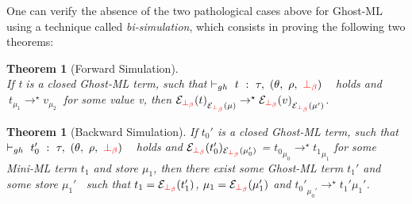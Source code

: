 \documentclass[a4paper,11pt,oneside]{article}
\theoremstyle{plain}
\newtheorem{theorem}[definition]{Theorem}
\newcommand{\rouge}[1]{\textcolor{red}{#1}}
\newcommand{\ghosttyping}[6]{\vdash_{gh}~#1~:~#2,~(#3,~#4,~\rouge{#5})~\textcolor{blue}{\boldsymbol{#6}}}
\newcommand{\evalstar}[4]{~#1_{\mu_#2} \rightarrow^{\star} #3_{\mu_#4} ~}
\newcommand{\Longdownarrow}{\rotatebox{90}{$\Longleftarrow$}}
\newcommand{\gbb}{\bot_\beta}
\newcommand{\gbbr}{\textcolor{red}{\gbb}}
\newcommand{\e}{\mathcal{E}}
\newcommand{\ebot}[1]{\e_{\gbbr}(#1)}
\begin{document}


One can verify the absence of the two pathological cases above for Ghost-ML
using a technique called \textit{bi-simulation}, which consists in proving  
the following two theorems:

\begin{theorem}[Forward Simulation]
~\\
If t is a closed Ghost-ML term, such that $\ghosttyping{t}{\tau}{\theta}{\rho}{\gbbr}{}$ ~holds and $\evalstar{t}{1}{v}{2}$ 
for some value \textit{v}, then 
${\ebot{t}}_{\ebot{\mu}} \rightarrow^\star {\ebot{v}}_{\ebot{\mu'}}$.
\end{theorem}

\begin{theorem}[Backward Simulation]
If $t_0'$ is a closed Ghost-ML term, such that $\ghosttyping{t_0'}{\tau}{\theta}{\rho}{\gbbr}{}$ ~holds and 
$\ebot{t_0'}_{\ebot{\mu_0'}}$ = ${{t_0}}_{{\mu_0}} \rightarrow^{\star} {{t_{1}}}_{\mu_1}$ 
for some Mini-ML term $t_1$ and store $\mu_1$, 
then there exist some Ghost-ML term $t_1'$ and some store $\mu_1'$~
such that $t_1 =\ebot{t_1'}$, $\mu_1 = \ebot{\mu_1'}$ and 
${t_0'}_{\mu_0'} \rightarrow^{\star} {t_1'}{\mu_1'}$.
\end{theorem}




\end{document}
